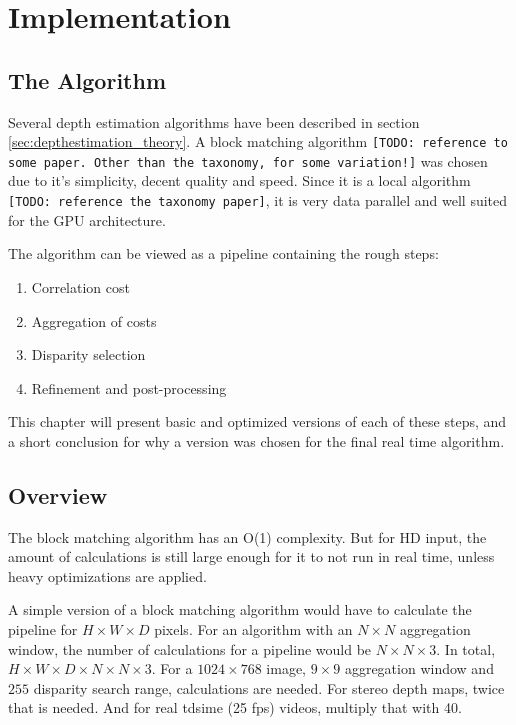 \chapter{Implementation}
\label{chap:impl}

\section{The Algorithm}

Several depth estimation algorithms have been described in section
\ref{sec:depthestimation_theory}. A block matching algorithm
\texttt{[TODO: reference to some paper. Other than the taxonomy, for
  some variation!]} was chosen due to it's simplicity, decent quality
and speed. Since it is a local algorithm \texttt{[TODO: reference the
  taxonomy paper]}, it is very data parallel and well suited for the
GPU architecture.

The algorithm can be viewed as a pipeline containing the rough steps:

\begin{enumerate}
\item Correlation cost
\item Aggregation of costs
\item Disparity selection
\item Refinement and post-processing
\end{enumerate}

This chapter will present basic and optimized versions of each of
these steps, and a short conclusion for why a version was chosen for
the final real time algorithm.

\section{Overview}

The block matching algorithm has an O(1) complexity. But for HD input,
the amount of calculations is still large enough for it to not run in
real time, unless heavy optimizations are applied.

A simple version of a block matching algorithm would have to calculate
the pipeline for $H \times W \times D$ pixels. For an algorithm with
an $N \times N$ aggregation window, the number of calculations for a
pipeline would be $N \times N \times 3$. In total, $H \times W \times
D \times N \times N \times 3$. For a $1024 \times 768$ image, $9
\times 9$ aggregation window and $255$ disparity search range,
calculations are needed. For stereo depth maps, twice that is needed.
And for real tdsime (25 fps) videos, multiply that with 40.


